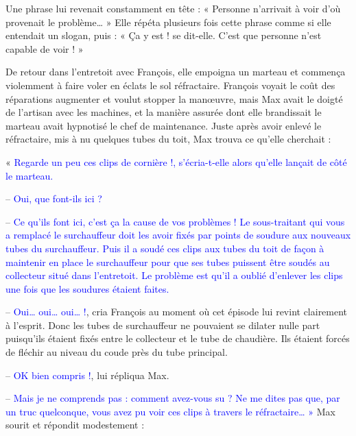 Une phrase lui revenait constamment en tête : « Personne n’arrivait à voir d’où provenait le problème… » Elle répéta plusieurs fois cette phrase comme si elle entendait un slogan, puis : « Ça y est ! se dit-elle. C’est que personne n’est capable de voir ! »
\vspace{0.3cm}

De retour dans l’entretoit avec François, elle empoigna un marteau et commença violemment à faire voler en éclats le sol réfractaire. François voyait le coût des réparations augmenter et voulut stopper la manœuvre, mais Max avait le doigté de l’artisan avec les machines, et la manière assurée dont elle brandissait le marteau avait hypnotisé le chef de maintenance. Juste après avoir enlevé le réfractaire, mis à nu quelques tubes du toit, Max trouva ce qu’elle cherchait : 
\vspace{0.3cm}

« \textcolor{blue}{Regarde un peu ces clips de cornière !, s’écria-t-elle alors qu’elle lançait de côté le marteau.}
\vspace{0.3cm}

–  \textcolor{blue}{Oui, que font-ils ici ? }
\vspace{0.3cm}

–  \textcolor{blue}{Ce qu’ils font ici, c’est ça la cause de vos problèmes ! Le sous-traitant qui vous a remplacé le surchauffeur doit les avoir fixés par points de soudure aux nouveaux tubes du surchauffeur. Puis il a soudé ces clips aux tubes du toit de façon à maintenir en place le surchauffeur pour que ses tubes puissent être soudés au collecteur situé dans l’entretoit. Le problème est qu’il a oublié d’enlever les clips une fois que les soudures étaient faites.}
\vspace{0.3cm}

–  \textcolor{blue}{Oui… oui… oui… !}, cria François au moment où cet épisode lui revint clairement à l’esprit. Donc les tubes de surchauffeur ne pouvaient se dilater nulle part puisqu’ils étaient fixés entre le collecteur et le tube de chaudière. Ils étaient forcés de fléchir au niveau du coude près du tube principal.
\vspace{0.3cm}

– \textcolor{blue}{OK bien compris !}, lui répliqua Max.
\vspace{0.3cm}

– \textcolor{blue}{Mais je ne comprends pas : comment avez-vous su ? Ne me dites pas que, par un truc quelconque, vous avez pu voir ces clips à travers le réfractaire… » }
Max sourit et répondit modestement :
\vspace{0.3cm}

